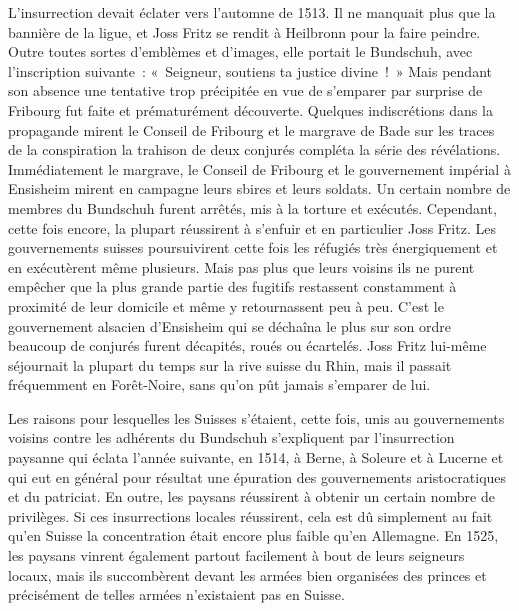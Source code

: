 \documentclass[french,twoside]{book} %
\begin{document}
L’insurrection devait éclater vers l’automne de 1513. Il ne manquait plus que la bannière de la ligue, et Joss Fritz se rendit à Heilbronn pour la faire peindre. Outre toutes sortes d’emblèmes et d’images, elle portait le Bundschuh, avec l’inscription suivante : « Seigneur, soutiens ta justice divine ! » Mais pendant son absence une tentative trop précipitée en vue de s’emparer par surprise de Fribourg fut faite et prématurément découverte. Quelques indiscrétions dans la propagande mirent le Conseil de Fribourg et le margrave de Bade sur les traces de la conspiration la trahison de deux conjurés compléta la série des révélations. Immédiatement le margrave, le Conseil de Fribourg et le gouvernement impérial à Ensisheim mirent en campagne leurs sbires et leurs soldats. Un certain nombre de membres du Bundschuh furent arrêtés, mis à la torture et exécutés. Cependant, cette fois encore, la plupart réussirent à s’enfuir et en particulier Joss Fritz. Les gouvernements suisses poursuivirent cette fois les réfugiés très énergiquement et en exécutèrent même plusieurs. Mais pas plus que leurs voisins ils ne purent empêcher que la plus grande partie des fugitifs restassent constamment à proximité de leur domicile et même y retournassent peu à peu. C’est le gouvernement alsacien d’Ensisheim qui se déchaîna le plus sur son ordre beaucoup de conjurés furent décapités, roués ou écartelés. Joss Fritz lui-même séjournait la plupart du temps sur la rive suisse du Rhin, mais il passait fréquemment en Forêt-Noire, sans qu’on pût jamais s’emparer de lui.\par
Les raisons pour lesquelles les Suisses s’étaient, cette fois, unis au gouvernements voisins contre les adhérents du Bundschuh s’expliquent par l’insurrection paysanne qui éclata l’année suivante, en 1514, à Berne, à Soleure et à Lucerne et qui eut en général pour résultat une épuration des gouvernements aristocratiques et du patriciat. En outre, les paysans réussirent à obtenir un certain nombre de privilèges. Si ces insurrections locales réussirent, cela est dû simplement au fait qu’en Suisse la concentration était encore plus faible qu’en Allemagne. En 1525, les paysans vinrent également partout facilement à bout de leurs seigneurs locaux, mais ils succombèrent devant les armées bien organisées des princes et précisément de telles armées n’existaient pas en Suisse.\par
\end{document}

